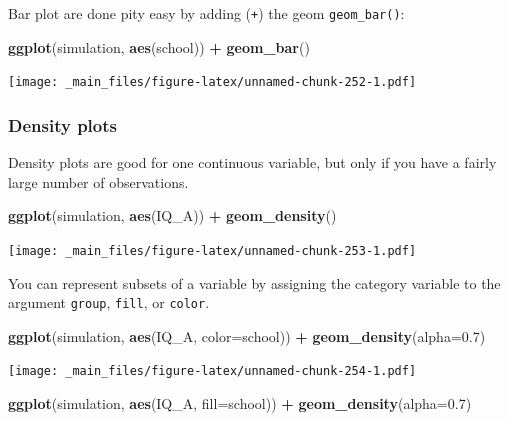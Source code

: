 \documentclass[
]{scrartcl}
\newenvironment{Shaded}{\begin{snugshade}}{\end{snugshade}}
\newcommand{\DataTypeTok}[1]{\textcolor[rgb]{0.13,0.29,0.53}{#1}}
\newcommand{\FloatTok}[1]{\textcolor[rgb]{0.00,0.00,0.81}{#1}}
\newcommand{\KeywordTok}[1]{\textcolor[rgb]{0.13,0.29,0.53}{\textbf{#1}}}
\newcommand{\NormalTok}[1]{#1}
\newcommand{\OperatorTok}[1]{\textcolor[rgb]{0.81,0.36,0.00}{\textbf{#1}}}
\newcommand{\StringTok}[1]{\textcolor[rgb]{0.31,0.60,0.02}{#1}}
\begin{document}
Bar plot are done pity easy by adding (\texttt{+}) the geom \texttt{geom\_bar()}:

\begin{Shaded}
\begin{Highlighting}[]
\KeywordTok{ggplot}\NormalTok{(simulation, }\KeywordTok{aes}\NormalTok{(school)) }\OperatorTok{+}
\StringTok{        }\KeywordTok{geom\_bar}\NormalTok{()}
\end{Highlighting}
\end{Shaded}

\texttt{[image: \_main\_files/figure-latex/unnamed-chunk-252-1.pdf]}

\hypertarget{density-plots}{%
\subsubsection{Density plots}\label{density-plots}}

Density plots are good for one continuous variable, but only if you have a fairly large number of observations.

\begin{Shaded}
\begin{Highlighting}[]
\KeywordTok{ggplot}\NormalTok{(simulation, }\KeywordTok{aes}\NormalTok{(IQ\_A)) }\OperatorTok{+}
\StringTok{        }\KeywordTok{geom\_density}\NormalTok{()}
\end{Highlighting}
\end{Shaded}

\texttt{[image: \_main\_files/figure-latex/unnamed-chunk-253-1.pdf]}

You can represent subsets of a variable by assigning the category variable to the argument \texttt{group}, \texttt{fill}, or \texttt{color}.

\begin{Shaded}
\begin{Highlighting}[]
\KeywordTok{ggplot}\NormalTok{(simulation, }\KeywordTok{aes}\NormalTok{(IQ\_A, }\DataTypeTok{color=}\NormalTok{school)) }\OperatorTok{+}
\StringTok{        }\KeywordTok{geom\_density}\NormalTok{(}\DataTypeTok{alpha=}\FloatTok{0.7}\NormalTok{)}
\end{Highlighting}
\end{Shaded}

\texttt{[image: \_main\_files/figure-latex/unnamed-chunk-254-1.pdf]}

\begin{Shaded}
\begin{Highlighting}[]
\KeywordTok{ggplot}\NormalTok{(simulation, }\KeywordTok{aes}\NormalTok{(IQ\_A, }\DataTypeTok{fill=}\NormalTok{school)) }\OperatorTok{+}
\StringTok{        }\KeywordTok{geom\_density}\NormalTok{(}\DataTypeTok{alpha=}\FloatTok{0.7}\NormalTok{)}
\end{Highlighting}
\end{Shaded}
\end{document}
